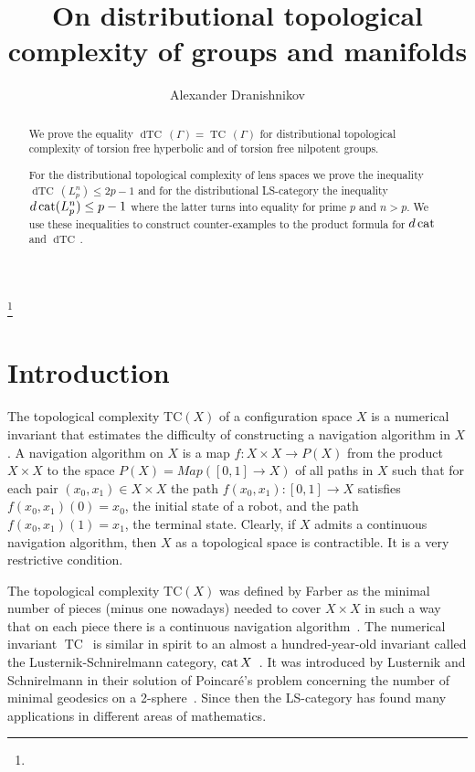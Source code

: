 \documentclass{amsart}
\numberwithin{equation}{section}
\theoremstyle{plain}
\theoremstyle{definition}
\def\TC{{\mathop\mathrm{TC}\,}}
\def\dTC{{\mathop\mathrm{dTC}\,}}
\def\cat{\protect\operatorname{cat}}
\begin{document}
\title[On distributional topological complexity of groups and manifolds]
{On distributional topological complexity of groups and manifolds}
\author[A.~Dranishnikov]
{Alexander Dranishnikov}
\address{{Alexander Dranishnikov, Department of Mathematics, University
of Florida, 358 Little Hall, Gainesville, FL 32611-8105, USA}}


\thanks{}


\begin{abstract} 
We prove the equality $\dTC(\Gamma)=\TC(\Gamma)$   for distributional topological complexity of torsion free hyperbolic and of torsion free nilpotent groups.

For the distributional topological complexity of lens spaces we prove the inequality  $\dTC(L^n_p)\le 2p-1$ and for the distributional LS-category the inequality $d\cat(L^n_p)\le p-1$ where the latter turns into equality for prime $p$ and $n>p$.  We use these inequalities to construct counter-examples to the product formula for $d\cat$ and $\dTC$.
\end{abstract}

\maketitle

\section{Introduction}
The topological complexity TC$(X)$ of a configuration space $X$ is a numerical invariant that estimates the difficulty  of constructing a navigation algorithm in $X$. A navigation algorithm on $X$ is a map $f:X\times X\to P(X)$ from the product $X\times X$ to the space $P(X)=Map([0,1]\to X)$ of all paths in $X$ such that for each pair $(x_0,x_1)\in X\times X$
the path $f(x_0,x_1):[0,1]\to X$ satisfies $f(x_0,x_1)(0)=x_0$, the initial state of a robot, and the path $f(x_0,x_1)(1)=x_1$, the terminal state. Clearly, if $X$ admits a continuous navigation algorithm, then $X$  as a topological space is contractible. It is a very restrictive condition. 

The topological complexity  TC$(X)$ was defined by Farber as the minimal number of pieces (minus one nowadays) needed to cover $X\times X$ in such a way that on each piece there is a continuous navigation algorithm~\cite{F1,F2}.
The numerical invariant $\TC$ is similar in spirit to an almost a hundred-year-old invariant called the Lusternik-Schnirelmann category, $\cat X$~\cite{LS,CLOT}. 
It was introduced by Lusternik and Schnirelmann in their solution of  Poincar\'e's problem concerning the number of minimal geodesics on  a 2-sphere~\cite{LS}. Since then the LS-category has found many applications in different areas of mathematics. 
\end{document}
